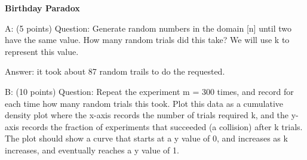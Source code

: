\documentclass{report}
\begin{document}
 
 \begin{center}
 \textbf{Birthday Paradox}
\end{center}
 
 \begin{flushleft}
A: (5 points) Question: Generate random numbers in the domain [n] until two have the same value. How many random trials did this take? We will use k to represent this value.
\end{flushleft}

\begin{flushleft}
Answer: it took about 87 random trails to do the requested.
\end{flushleft}

\begin{flushleft}
B: (10 points) Question: Repeat the experiment m = 300 times, and record for each time how many random trials this took. Plot this data as a cumulative density plot where the x-axis records the number of trials required k, and the y-axis records the fraction of experiments that succeeded (a collision) after k trials. The plot should show a curve that starts at a y value of 0, and increases as k increases, and eventually reaches a y value of 1.
\end{flushleft}
 
\end{document}
